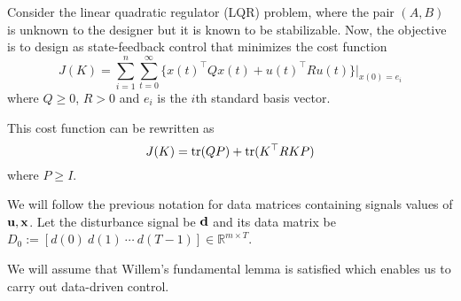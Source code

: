 Consider the linear quadratic regulator (LQR) problem, where the pair $(A,B)$ is unknown to the designer but it is known to be stabilizable.
Now, the objective is to design as state-feedback control that minimizes the cost function
\begin{equation}
J(K)=\sum_{i=1}^n\sum_{t=0}^{\infty} \{x(t)^\top Qx(t) + u(t)^\top Ru(t)\}|_{x(0)=e_i}
\end{equation}
where $Q\geq 0$, $R> 0$ and $e_i$ is the $i$th standard  basis vector.

This cost function can be rewritten as
\begin{equation}
J(K)=\operatorname{tr}(QP)+\operatorname{tr}(K^\top RKP)
\end{equation}
where $P\geq I$.

We will follow the previous notation for data matrices containing signals values of $\mathbf{u}, \mathbf{x}$.
Let the disturbance signal be $\mathbf{d}$ and its data matrix be $D_0:=[d(0)\ d(1)\ \cdots\ d(T-1)]\in \mathbb{R}^{m\times T}$.

We will assume that Willem's fundamental lemma is satisfied which enables us to carry out data-driven control.

